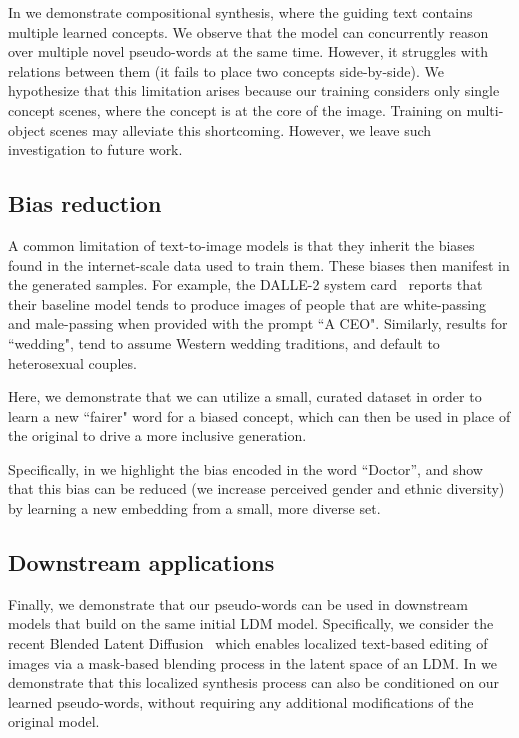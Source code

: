
In  we demonstrate compositional synthesis, where the guiding text contains multiple learned concepts. We observe that the model can concurrently reason over multiple novel pseudo-words at the same time. However, it struggles with relations between them (\eg it fails to place two concepts side-by-side). We hypothesize that this limitation arises because our training considers only single concept scenes, where the concept is at the core of the image. Training on multi-object scenes may alleviate this shortcoming. However, we leave such investigation to future work.

\subsection{Bias reduction}

A common limitation of text-to-image models is that they inherit the biases found in the internet-scale data used to train them. These biases then manifest in the generated samples. For example, the DALLE-2 system card~\citep{mishkin2022risks} reports that their baseline model tends to produce images of people that are white-passing and male-passing when provided with the prompt ``A CEO". Similarly, results for ``wedding", tend to assume Western wedding traditions, and default to heterosexual couples.

Here, we demonstrate that we can utilize a small, curated dataset in order to learn a new ``fairer" word for a biased concept, which can then be used in place of the original to drive a more inclusive generation.

Specifically, in  we highlight the bias encoded in the word ``Doctor'', and show that this bias can be reduced (\ie we increase perceived gender and ethnic diversity) by learning a new embedding from a small, more diverse set.



\subsection{Downstream applications}

Finally, we demonstrate that our pseudo-words can be used in downstream models that build on the same initial LDM model. Specifically, we consider the recent Blended Latent Diffusion~\citep{avrahami2022blendedlatent} which enables localized text-based editing of images via a mask-based blending process in the latent space of an LDM. In  we demonstrate that this localized synthesis process can also be conditioned on our learned pseudo-words, without requiring any additional modifications of the original model. 

